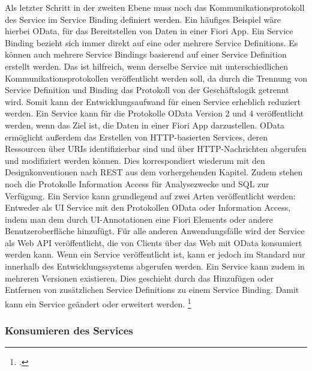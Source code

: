 Als letzter Schritt in der zweiten Ebene muss noch das Kommunikationsprotokoll des Service im Service Binding definiert werden. Ein häufiges Beispiel wäre hierbei OData, für das Bereitstellen von Daten in einer Fiori App. Ein Service Binding bezieht sich immer direkt auf eine oder mehrere Service Definitions. Es können auch mehrere Service Bindings basierend auf einer Service Definition erstellt werden. Das ist \zB hilfreich, wenn derselbe Service mit unterschiedlichen Kommunikationsprotokollen veröffentlicht werden soll, da durch die Trennung von Service Definition und Binding das Protokoll von der Geschäftslogik getrennt wird. Somit kann der Entwicklungsaufwand für einen Service erheblich reduziert werden. Ein Service kann für die Protokolle OData Version 2 und 4 veröffentlicht werden, wenn das Ziel ist, die Daten in einer Fiori App darzustellen. OData ermöglicht au{\ss}erdem das Erstellen von HTTP-basierten Services, deren Ressourcen über URIs identifizierbar sind und über HTTP-Nachrichten abgerufen und modifiziert werden können. Dies korrespondiert wiederum mit den Designkonventionen nach REST aus dem vorhergehenden Kapitel. Zudem stehen noch die Protokolle Information Access für Analysezwecke und SQL zur Verfügung. Ein Service kann grundlegend auf zwei Arten veröffentlicht werden: Entweder als UI Service mit den Protokollen OData oder Information Access, indem man dem durch UI-Annotationen eine Fiori Elements oder andere Benutzeroberfläche hinzufügt. Für alle anderen Anwendungsfälle wird der Service als Web API veröffentlicht, die von Clients über das Web mit OData konsumiert werden kann. Wenn ein Service veröffentlicht ist, kann er jedoch im Standard nur innerhalb des Entwicklungssystems abgerufen werden. Ein Service kann zudem in mehreren Versionen existieren. Dies geschieht durch das Hinzufügen oder Entfernen von zusätzlichen Service Definitions zu einem Service Binding. Damit kann ein Service geändert oder erweitert werden. \footcite[Vgl.][]{sap_rap_2023}

\subsubsection{Konsumieren des Services}

